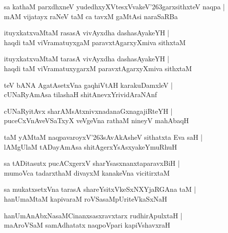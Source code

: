\documentclass[twoside,12pt,openright]{book}
\def\S{\char'263}
\newcounter{shloka}[chapter]
\begin{document}
\begin{shloka}%
sa kathaM parxdhxneV yudedhxyXVtesxVvakeV\S garxsithxteV naqpa |\\
mAM vijatayx raNeV taM ca tavxM gaMtAsi naraSaRBa
\end{shloka}

\begin{shloka}%
ituyxkatxvaMtaM rasasA vivAyxdha dashasAyakeYH |\\
haqdi taM viVramatuyxgaM paravxtAgarxyXmiva sithxtaM
\end{shloka}

\begin{shloka}%
ituyxkatxvaMtaM tarasA vivAyxdha dashasAyakeYH |\\
haqdi taM viVramatuxygarxM paravxtAgarxyXmiva sithxtaM
\end{shloka}

\begin{shloka}%
teV bANA AgatAsetxVna gaqhiVtAH karakuDamxleV |\\
cUNaRyAmAsa tilashaH shitAnevxYrividAraNAnf 
\end{shloka}

\begin{shloka}%
cUNaRyitAvx sharAMsAtxnivxnadanaGxnagajiRteYH |\\
puceCxVnAveVSaTxyX veVgeVna rathaM nineyV mahAbaqH
\end{shloka}

\begin{shloka}%
taM yAMtaM naqpavaroyxV\S sAvAkAsheV sithatxta Eva saH |\\
lAMgUlaM tADayAmAsa shitAgerxYsAsxyakeYmuRhuH 
\end{shloka}

\begin{shloka}%
sa tADitasutx pucACxgerxV sharYsasxnanxtaparavxBiH |\\
mumoVca tadarxthaM divayxM kanakeVna vicitirxtaM 
\end{shloka}

\begin{shloka}%
sa mukatxsetxVna tarasA shareYsitxVkeSxNXYjaRGAna taM |\\
hanUmaMtaM kapivaraM roVSasaMpUriteVkaSxNaH 
\end{shloka}

\begin{shloka}%
hanUmAnAbxNasaMCinanxsasxravxtarx rudhirApulxtaH |\\
maAroVSaM samAdhatatx naqpoVpari kapiVshavxraH
\end{shloka}
\end{document}
